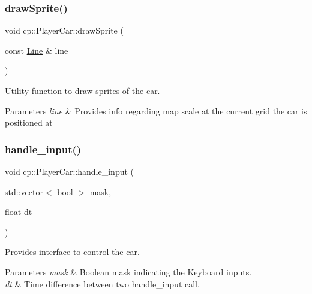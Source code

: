 \subsubsection{\texorpdfstring{draw\+Sprite()}{drawSprite()}}
{\footnotesize\ttfamily void cp\+::\+Player\+Car\+::draw\+Sprite (\begin{DoxyParamCaption}\item[{const \hyperlink{classcp_1_1_line}{Line} \&}]{line }\end{DoxyParamCaption})}



Utility function to draw sprites of the car. 


\begin{DoxyParams}{Parameters}
{\em line} & Provides info regarding map scale at the current grid the car is positioned at \\
\hline
\end{DoxyParams}
\mbox{\label{classcp_1_1_player_car_aa3122b8ea7b398d5b82a5883d052835a}} 
\subsubsection{\texorpdfstring{handle\+\_\+input()}{handle\_input()}}
{\footnotesize\ttfamily void cp\+::\+Player\+Car\+::handle\+\_\+input (\begin{DoxyParamCaption}\item[{std\+::vector$<$ bool $>$}]{mask,  }\item[{float}]{dt }\end{DoxyParamCaption})}



Provides interface to control the car. 


\begin{DoxyParams}{Parameters}
{\em mask} & Boolean mask indicating the Keyboard inputs. \\
\hline
{\em dt} & Time difference between two handle\+\_\+input call. \\
\hline
\end{DoxyParams}
\mbox{\label{classcp_1_1_player_car_a7c99c7961e6e6301529b65cfdc1104bf}} 
